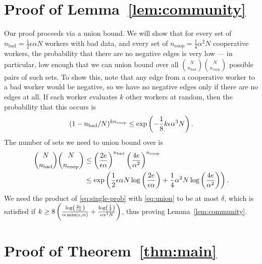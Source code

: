 \documentclass[anon,12pt]{colt2016} %
\newcommand{\goodfrac}{\alpha}
\newcommand{\quality}{\epsilon}
\begin{document}
\section{Proof of Lemma~\ref{lem:community}}
\label{sec:community-proof}

\newcommand{\nbad}{n_{\mathrm{bad}}}
\newcommand{\ncoop}{n_{\mathrm{coop}}}

Our proof proceeds via a union bound. 
We will show that for every set of $\nbad = \frac{1}{2}\quality\goodfrac N$ 
workers with bad data, and every set of $\ncoop = \frac{1}{4}\goodfrac^2 N$ 
cooperative workers, the probability that there are no negative 
edges is very low --- in particular, low enough that we can 
union bound over all $\binom{N}{\nbad}\binom{N}{\ncoop}$ possible 
pairs of such sets. To show this, note that any edge from a cooperative 
worker to a bad worker would be negative, so we have no negative edges only 
if there are no edges at all. If each worker evaluates $k$ other workers at 
random, then the probability that this occurs is 
\begin{equation}
\label{eq:single-prob}
(1-\nbad/N)^{k\ncoop} \leq \exp\p{-\frac{1}{8}k\quality\goodfrac^3N}. 
\end{equation}
The number of sets we need to union bound over is 
\begin{align}\binom{N}{\nbad}\binom{N}{\ncoop} &\leq \p{\frac{2e}{\quality\goodfrac}}^{\nbad}\p{\frac{4e}{\goodfrac^2}}^{\ncoop} \\
\label{eq:union} &\leq \exp\p{\frac{1}{2}\quality\goodfrac N\log\p{\frac{2e}{\quality\goodfrac}} + \frac{1}{4}\goodfrac^2 N\log\p{\frac{4e}{\goodfrac^2}}}.
\end{align}
We need the product of \eqref{eq:single-prob} with \eqref{eq:union} to be at most 
$\delta$, which is satisfied if 
$k \geq 8\p{\frac{\log\p{\frac{2e}{\quality\goodfrac}}}{\goodfrac\min\p{\quality,\goodfrac}} + \frac{\log\p{\frac{1}{\delta}}}{\quality\goodfrac^3N}}$,
thus proving Lemma~\ref{lem:community}.

\section{Proof of Theorem~\ref{thm:main}}
\label{sec:main-proof}

\acks{}



%
%
%
%
\end{document}
